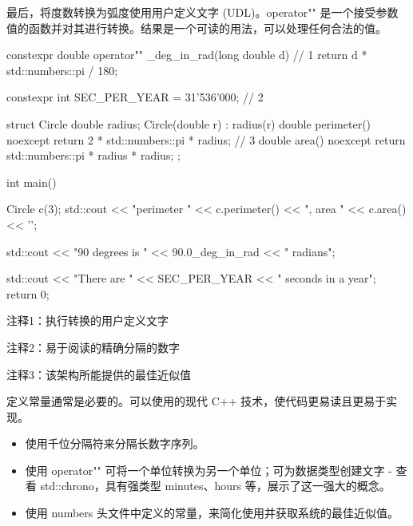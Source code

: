 最后，将度数转换为弧度使用用户定义文字 (UDL)。operator"" 是一个接受参数值的函数并对其进行转换。结果是一个可读的用法，可以处理任何合法的值。


\begin{cpp}
constexpr double operator"" _deg_in_rad(long double d) { // 1
  return d * std::numbers::pi / 180;
}

constexpr int SEC_PER_YEAR = 31'536'000; // 2

struct Circle {
  double radius;
  Circle(double r) : radius(r) {}
  double perimeter() noexcept { return 2 *
  std::numbers::pi * radius; } // 3
  double area() noexcept { return std::numbers::pi * radius * radius; }
};

int main() {
  Circle c(3);
  std::cout << "perimeter " << c.perimeter() << ", area " << c.area()
    << '\n';

  std::cout << "90 degrees is " << 90.0_deg_in_rad << " radians\n";

  std::cout << "There are " << SEC_PER_YEAR << " seconds in a year\n";
  return 0;
}
\end{cpp}

{\footnotesize
注释1：执行转换的用户定义文字

注释2：易于阅读的精确分隔的数字

注释3：该架构所能提供的最佳近似值
}

定义常量通常是必要的。可以使用的现代 C++ 技术，使代码更易读且更易于实现。


\begin{itemize}
\item
使用千位分隔符来分隔长数字序列。

\item
使用 operator"" 可将一个单位转换为另一个单位；可为数据类型创建文字 - 查看 std::chrono，具有强类型 minutes、hours 等，展示了这一强大的概念。

\item
使用 numbers 头文件中定义的常量，来简化使用并获取系统的最佳近似值。
\end{itemize}
